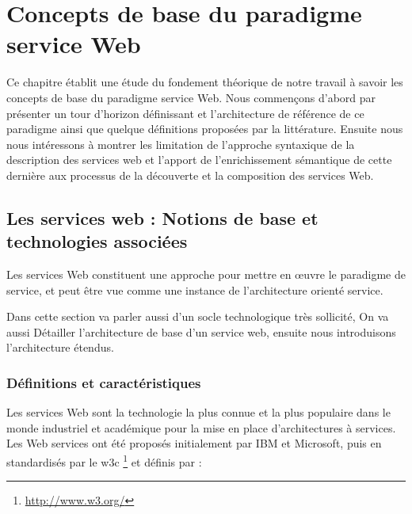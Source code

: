 

\chapter{Concepts de base du paradigme service Web}

Ce chapitre établit une étude du fondement théorique de notre travail à savoir les concepts de base 
du paradigme service Web.  Nous commençons d'abord par présenter un tour d'horizon définissant et l'architecture
de référence de ce paradigme ainsi que quelque définitions proposées par la littérature. Ensuite nous nous 
intéressons à montrer les limitation de l'approche syntaxique de la description des services web et 
l'apport de l'enrichissement sémantique de cette dernière aux processus de la découverte et la composition 
des services Web.\\
\newpage

  \section{Les services web : Notions de base et \\technologies associées} 

  Les services Web constituent une approche pour mettre en œuvre le paradigme de service,
  et peut être vue comme une instance de l'architecture orienté service.

  Dans cette section va parler aussi d'un socle technologique très sollicité, On va aussi Détailler 
  l'architecture de base d'un service web, ensuite nous introduisons l'architecture étendus.

    \subsection{Définitions et caractéristiques }
    Les services Web sont la technologie la plus connue et la plus populaire dans le monde 
    industriel et académique pour la mise en place d’architectures à services.
    Les Web services ont été proposés initialement par IBM \cite{kreger2001web} et Microsoft, puis en
    standardisés par le \acrshort{w3c} \footnote{\url{http://www.w3.org/}} et définis \cite{WSA} par :\\


